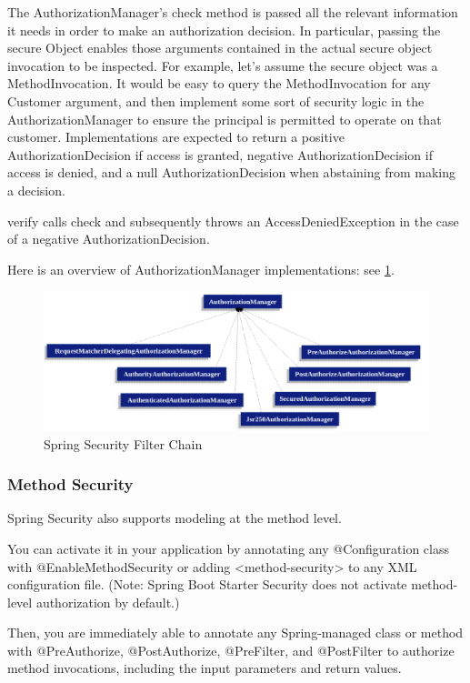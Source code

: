 \documentclass{scrartcl}
\begin{document}
The AuthorizationManager's check method is passed all the relevant information it needs in order to make an authorization decision. In particular, passing the secure Object enables those arguments contained in the actual secure object invocation to be inspected. For example, let’s assume the secure object was a MethodInvocation. It would be easy to query the MethodInvocation for any Customer argument, and then implement some sort of security logic in the AuthorizationManager to ensure the principal is permitted to operate on that customer. Implementations are expected to return a positive AuthorizationDecision if access is granted, negative AuthorizationDecision if access is denied, and a null AuthorizationDecision when abstaining from making a decision.

verify calls check and subsequently throws an AccessDeniedException in the case of a negative AuthorizationDecision.

Here is an overview of AuthorizationManager implementations: see \ref{fig:auth-manag-impl}.

\begin{figure}
    \centering
    \includegraphics[width=1\linewidth]{auth-manag-impl}
    \caption{Spring Security Filter Chain}
    \label{fig:auth-manag-impl}
\end{figure}

\subsubsection{Method Security}

Spring Security also supports modeling at the method level.

You can activate it in your application by annotating any @Configuration class with @EnableMethodSecurity or adding <method-security> to any XML configuration file. (Note: Spring Boot Starter Security does not activate method-level authorization by default.)

Then, you are immediately able to annotate any Spring-managed class or method with @PreAuthorize, @PostAuthorize, @PreFilter, and @PostFilter to authorize method invocations, including the input parameters and return values.
\end{document}
